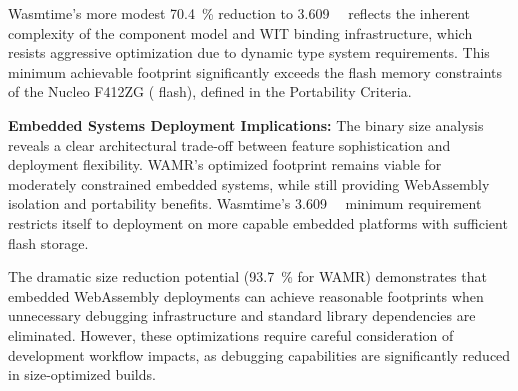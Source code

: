 Wasmtime's more modest \SI[round-precision=1]{70.4}{\percent} reduction to \SI{3.609}{\mega\byte} reflects the inherent complexity of the component model and WIT binding infrastructure, which resists aggressive optimization due to dynamic type system requirements. This minimum achievable footprint significantly exceeds the flash memory constraints of the Nucleo F412ZG ( flash), defined in the Portability Criteria.

\textbf{Embedded Systems Deployment Implications:} The binary size analysis reveals a clear architectural trade-off between feature sophistication and deployment flexibility. WAMR's optimized  footprint remains viable for moderately constrained embedded systems, while still providing WebAssembly isolation and portability benefits. Wasmtime's \SI{3.609}{\mega\byte} minimum requirement restricts itself to deployment on more capable embedded platforms with sufficient flash storage.

The dramatic size reduction potential (\SI[round-precision=1]{93.7}{\percent} for WAMR) demonstrates that embedded WebAssembly deployments can achieve reasonable footprints when unnecessary debugging infrastructure and standard library dependencies are eliminated. However, these optimizations require careful consideration of development workflow impacts, as debugging capabilities are significantly reduced in size-optimized builds.